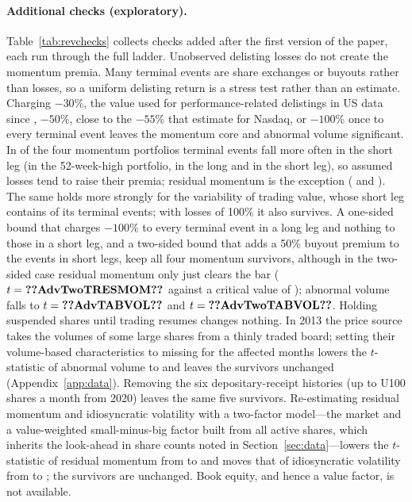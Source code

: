 \documentclass[11pt]{article}
\begin{document}
\paragraph{Additional checks (exploratory).} Table~\ref{tab:revchecks} collects checks added after the first version of
the paper, each run through the full ladder. Unobserved delisting losses do not create the momentum premia. Many
terminal events are share exchanges or buyouts rather than losses, so a uniform delisting return is a stress test
rather than an estimate. Charging $-30$\%, the value used for performance-related delistings in US data since
\citet{shumway1997delisting}, $-50$\%, close to the $-55$\% that \citet{shumway1999delisting} estimate for Nasdaq, or
$-100$\% once to every terminal event leaves the momentum core and abnormal volume significant. In
 of the four momentum portfolios terminal events fall more often in the short leg (in the
52-week-high portfolio,  in the long and  in the short leg), so assumed losses tend
to raise their premia; residual momentum is the exception ( and ). The same
holds more strongly for the variability of trading value, whose short leg contains  of its
 terminal events; with losses of 100\% it also survives. A one-sided bound that charges $-100$\% to
every terminal event in a long leg and nothing to those in a short leg, and a two-sided bound that adds a 50\% buyout
premium to the events in short legs, keep all four momentum survivors, although in the two-sided case residual
momentum only just clears the bar ($t=\val{AdvTwoTRESMOM}$ against a critical value of ); abnormal
volume falls to $t=\val{AdvTABVOL}$ and $t=\val{AdvTwoTABVOL}$. Holding suspended shares until trading resumes changes
nothing. In 2013 the price source takes the volumes of some large shares from a thinly traded board; setting their
volume-based characteristics to missing for the affected months lowers the $t$-statistic of abnormal volume to
 and leaves the survivors unchanged (Appendix~\ref{app:data}). Removing the six depositary-receipt histories (up to
 U100 shares a month from 2020) leaves the same five survivors. Re-estimating residual momentum and
idiosyncratic volatility with a two-factor model---the market and a value-weighted small-minus-big factor built from
all active shares, which inherits the look-ahead in share counts noted in Section~\ref{sec:data}---lowers the $t$-statistic of residual momentum from  to  and moves that
of idiosyncratic volatility from  to ; the survivors are unchanged. Book equity, and hence
a value factor, is not available.
\end{document}
